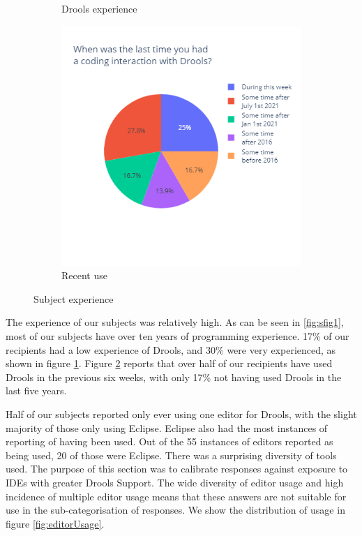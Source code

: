 \begin{figure}[H]
\begin{subfigure}{.33\textwidth}
      \caption{Drools experience}
      \label{fig:sfig2}
    \end{subfigure}
    \begin{subfigure}{.33\textwidth}
        \centering
        \includegraphics[width=.95\linewidth]{Sections/images/pie_recentusage.png}
        \caption{Recent use}
        \label{fig:sfig3}
      \end{subfigure}
    \caption{Subject experience}
    \label{fig:subject_experience}
\end{figure}

The experience of our subjects was relatively high.
As can be seen in \ref{fig:sfig1}, most of our subjects have over ten years of programming experience.
17\% of our recipients had a low experience of Drools, and 30\% were very experienced, as shown in figure \ref{fig:sfig2}.
Figure \ref{fig:sfig3} reports that over half of our recipients have used Drools in the previous six weeks, with only 17\% not having used Drools in the last five years.

Half of our subjects reported only ever using one editor for Drools, with the slight majority of those only using Eclipse.
Eclipse also had the most instances of reporting of having been used.
Out of the 55 instances of editors reported as being used, 20 of those were Eclipse.
There was a surprising diversity of tools used.
The purpose of this section was to calibrate responses against exposure to IDEs with greater Drools Support.
The wide diversity of editor usage and high incidence of multiple editor usage means that these answers are not suitable for use in the sub-categorisation of responses. 
We show the distribution of usage in figure \ref{fig:editorUsage}.

